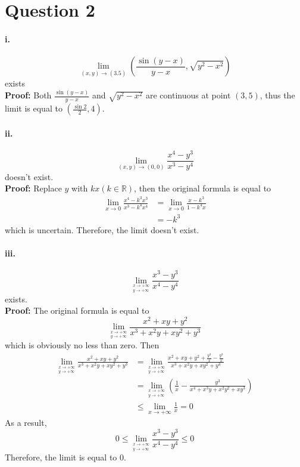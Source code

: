 \documentclass[11pt, a4paper]{article}
\begin{document}
\section*{Question 2}

\paragraph{i.}
$$\lim_{(x, y) \to (3.5)} (\frac{\sin (y - x)}{y - x}, \sqrt{y ^ 2 - x ^ 2})$$ exists \\
\textbf{Proof:} Both $\frac{\sin (y - x)}{y - x}$ and $\sqrt{y ^ 2 - x ^ 2}$ are continuous at point $(3, 5)$, thus the limit is equal to $(\frac{\sin 2}{2}, 4)$.

\paragraph{ii.}
$$\lim_{(x, y) \to (0, 0)} \frac{x ^ 4 - y ^ 3}{x ^ 3 - y ^ 4}$$ doesn't exist. \\
\textbf{Proof:} Replace $y$ with $kx (k \in \mathbb{R})$, then the original formula is equal to 
$$\begin{aligned}
    \lim_{x \to 0} \frac{x ^ 4 - k ^ 3 x ^ 3}{x ^ 3 - k ^ 4 x ^ 4} &= \lim_{x \to 0} \frac{x - k ^ 3}{1 - k ^ 4 x} \\
    &= -k ^ 3
\end{aligned}$$ which is uncertain. Therefore, the limit doesn't exist.

\paragraph{iii.}
$$\lim\limits_{^{x \to +\infty}_{y \to +\infty}} \frac{x ^ 3 - y ^ 3}{x ^ 4 - y ^ 4}$$ exists. \\
\textbf{Proof:} The original formula is equal to 
$$\lim\limits_{^{x \to +\infty}_{y \to +\infty}} \frac{x ^ 2 + xy + y ^ 2}{x ^ 3 + x ^ 2 y + x y ^ 2 + y ^ 3}$$ which is obviously no less than zero. Then
$$\begin{aligned}
\lim\limits_{^{x \to +\infty}_{y \to +\infty}} \frac{x ^ 2 + xy + y ^ 2}{x ^ 3 + x ^ 2 y + x y ^ 2 + y ^ 3} &= 
\lim\limits_{^{x \to +\infty}_{y \to +\infty}} \frac{x ^ 2 + xy + y ^ 2 + \frac{y ^ 3}{x} - \frac{y ^3}{x}}{x ^ 3 + x ^ 2 y + x y ^ 2 + y ^ 3} \\
&= 
\lim\limits_{^{x \to +\infty}_{y \to +\infty}} (\frac{1}{x} - \frac{y ^ 3}{x ^ 4 + x ^ 3 y + x ^ 2 y ^ 2 + x y ^ 3}) \\
&\leq 
\lim_{x \to +\infty} \frac{1}{x} = 0
\end{aligned}$$
As a result, 
$$0 \leq \lim\limits_{^{x \to +\infty}_{y \to +\infty}} \frac{x ^ 3 - y ^ 3}{x ^ 4 - y ^ 4} \leq 0$$
Therefore, the limit is equal to 0.
\end{document}
